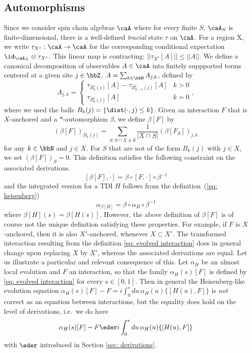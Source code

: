 \subsection{Automorphisms}\label{sec: automorphisms}
Since we consider spin chain algebras $\caA$ where for every finite $S$, $\caA_S$ is finite-dimensional, there is a well-defined \emph{tracial} state $\tau$ on $\caA$. For a region X, we write  $ \tau_{X^c}:\caA \to \caA$ for the corresponding conditional expectation $\id_{\caA_X}\otimes \tau_{X^c}$. This linear map is contracting:  $|| \tau_{X^c}[A] || \leq ||A||$.  We define a canonical decomposition of observables  $A\in\caA$ into finitely suppported terms centered at a given site $j \in\bbZ$, $A=\sum_{k\in\bbN} A_{j,k}$, defined by 
\begin{equation}\label{eq: decomposition finite}
	A_{j,k}=\begin{cases}  \tau_{B^c_{k}(j)}[A]- \tau_{B^c_{k-1}(j)} [A]  &  k>0  \\
		\tau_{B^c_{0}(j)}[A] & k=0
	\end{cases},
\end{equation}
where we used the balls $B_k(j)=\{  \dist(\cdot,j)\leq k\}$. 
Given an interaction $F$ that is $X$-anchored and a $*$-automorphism $\beta$, we define $\beta[F]$ by
\begin{equation} \label{eq: evolved interaction}
	(\beta[F])_{B_k(j)}=\sum_{S: S \cap X \neq \emptyset} \frac{1}{|X\cap S|}     (\beta[F_S])_{j,k}
\end{equation}
for any $k\in\bbN$ and $j\in X$. For $S$ that are not of the form $B_k(j)$ with $j\in X$, we set $(\beta[F])_{S}=0$. 
This definition satisfies the following constraint on the associated derivations. 
\begin{equation} \label{eq: commutation autos}
	[\beta[F],\cdot]= \beta \circ [F,\cdot] \circ \beta^{-1}
\end{equation}
and the integrated version for a TDI $H$ follows from the definition~(\ref{eq: heisenberg})
\begin{equation} \label{eq: commutation autos integrated}
	\alpha_{\beta[H]}= \beta \circ \alpha_H \circ \beta^{-1}
\end{equation}
where $\beta[H](s)=\beta[H(s)]$. 
However, the above definition of $\beta[F]$ is of course not the unique definition satisfying these properties. For example, if $F$ is $X$-anchored, then it is also $X'$-anchored, whenever $ X\subset X'$. The transformed interaction resulting  from the definition \eqref{eq: evolved interaction} does in general change upon replacing $X$ by $X'$, whereas the associated derivations are equal.  
Let us illustrate a particular  and relevant consequence of this. Let $\alpha_H$ be an almost local evolution and $F$ an interaction, so that the family 
$\alpha_H(s)[F]$ is defined by \eqref{eq: evolved interaction} for every $s\in [0,1]$.  Then in general the Heisenberg-like evolution equation $
\alpha_H(s)[F] - F=  i\int_{0}^{s}  du \,   \alpha_H(u) \{[H(u),F]\}
$ 
is \emph{not} correct as an equation between interactions, but the equality does hold on the level of derivations, i.e.\ we do have
$$
\alpha_H(s)[F] - F \eder  i\int_{0}^{s} du  \,  \alpha_H(u)  \{[H(u),F]\}
$$ 
with $\eder$ introduced in Section \ref{sec: derivations}. 


